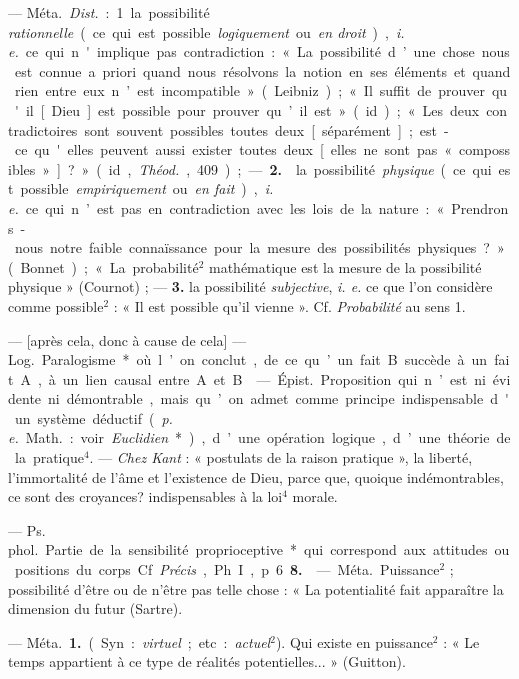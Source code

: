 \begin{itemize}[leftmargin=1cm, label=, itemsep=1pt]
 — \si{Méta.} {\it Dist.} : 1. la possibilité {\it
rationnelle} (ce qui est possible {\it logiquement} ou {\it en droit}),
{\it i. e.} ce qui n'implique pas contradiction : « La possibilité d’une
chose nous est connue a priori quand nous résolvons la notion en ses éléments
et quand rien entre eux n’est incompatible » (Leibniz) ; « Il suffit de
prouver qu'il [Dieu] est possible pour prouver qu’il est » (id.) ; « Les deux
contradictoires sont souvent possibles toutes deux [séparément]; est-ce
qu'elles peuvent aussi exister toutes deux [elles ne sont pas « compossibles
»] ? » (id., {\it Théod.}, 409) ; —  {\bf 2.}  la possibilité
{\it physique} (ce qui est possible {\it empiriquement} ou {\it en fait}),
{\it i. e.} ce qui n’est pas en contradiction avec les lois de la nature : «
Prendrons-nous notre faible connaïssance pour la mesure des possibilités
physiques ? » (Bonnet) ; « La probabilité$^2$ mathématique est la mesure de
la possibilité physique » (Cournot) ; — {\bf 3.}  la
possibilité {\it subjective}, {\it i. e.} ce que l’on considère comme
possible$^2$ : « Il est possible qu'il vienne ». Cf. {\it Probabilité} au
sens 1.

 — [après cela, donc à cause de cela] —
\si{Log.} Paralogisme* où l’on conclut, de ce qu’un fait B succède à un fait
A, à un lien causal entre A et B.

 — \si{Épist.} Proposition qui n’est ni évidente ni démontrable,
mais qu’on admet comme principe indispensable d'un système déductif
({\it p. e.} \si{Math.} : voir {\it Euclidien}*), d’une opération logique,
d’une théorie de la pratique$^4$. — {\it Chez Kant} : « postulats de la
raison pratique », la liberté, l’immortalité de l'âme et l’existence de Dieu,
parce que, quoique indémontrables, ce sont des croyances? indispensables à la
loi$^4$ morale.

 — \si{Ps. phol.} Partie de la sensibilité
proprioceptive* qui correspond aux attitudes ou positions du corps. Cf
{\it Précis}, Ph. I, p. 6 {\bf 8.}

 — \si{Méta.} Puissance$^2$ ; possibilité d’être ou de
n'être pas telle chose : « La potentialité fait apparaître la dimension du
futur (Sartre).

 — \si{Méta.} {\bf 1.} (Syn. : {\it virtuel} ; etc. : {\it actuel}$^2$). Qui existe en puissance$^2$ : « Le temps appartient à ce type de réalités potentielles... » (Guitton).


\end{itemize}

